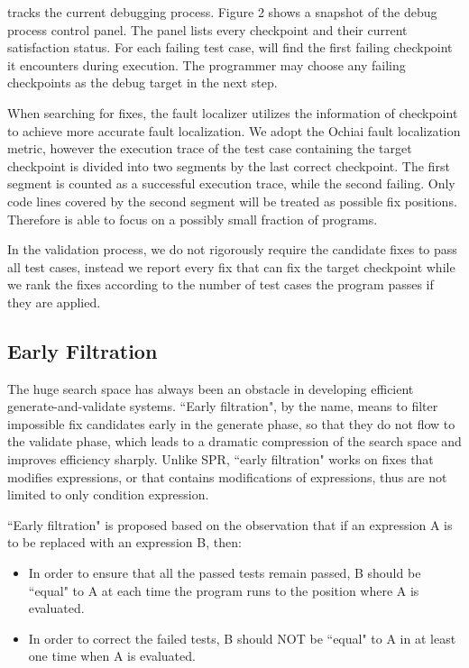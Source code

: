 \SmartDebug tracks the current debugging process. Figure 2 shows a snapshot of the debug process control panel. The panel lists every checkpoint and their current satisfaction status. For each failing test case, \SmartDebug will find the first failing checkpoint it encounters during execution. The programmer may choose any failing checkpoints as the debug target in the next step.

When searching for fixes, the fault localizer utilizes the information of checkpoint to achieve more accurate fault localization. We adopt the Ochiai\cite{Abreu:2006:ESC:1193217.1194368} fault localization metric, however the execution trace of the test case containing the target checkpoint is divided into two segments by the last correct checkpoint. The first segment is counted as a successful execution trace, while the second failing. Only code lines covered by the second segment will be treated as possible fix positions. Therefore \SmartDebug is able to focus on a possibly small fraction of programs.

In the validation process, we do not rigorously require the candidate fixes to pass all test cases, instead we report every fix that can fix the target checkpoint while we rank the fixes according to the number of test cases the program passes if they are applied.




\subsection{Early Filtration}

The huge search space has always been an obstacle in developing efficient generate-and-validate systems. ``Early filtration", by the name, means to filter impossible fix candidates early in the generate phase, so that they do not flow to the validate phase, which leads to a dramatic compression of the search space and improves efficiency sharply. Unlike SPR\cite{Long:2015:SPR:2786805.2786811}, ``early filtration" works on fixes that modifies expressions, or that contains modifications of expressions, thus are not limited to only condition expression.

``Early filtration" is proposed based on the observation that if an expression A is to be replaced with an expression B, then:
\begin{itemize}	
	\item{In order to ensure that all the passed tests remain passed, B should be ``equal" to A at each time the program runs to the position where A is evaluated.}
	\item{In order to correct the failed tests, B should NOT be ``equal" to A in at least one time when A is evaluated.}
\end{itemize}

